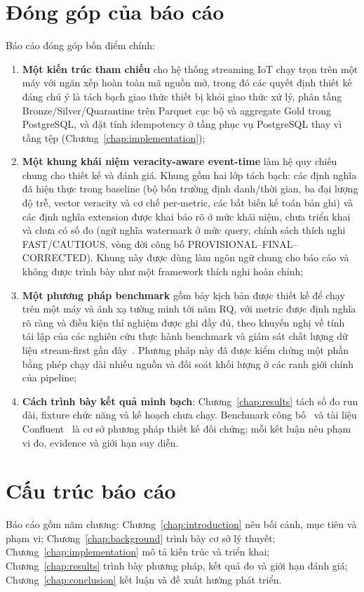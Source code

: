 \section{Đóng góp của báo cáo}

Báo cáo đóng góp bốn điểm chính:

\begin{enumerate}
  \item \textbf{Một kiến trúc tham chiếu} cho hệ thống streaming IoT chạy
        trọn trên một máy với ngăn xếp hoàn toàn mã nguồn mở, trong đó các
        quyết định thiết kế đáng chú ý là tách bạch giao thức thiết bị khỏi
        giao thức xử lý, phân tầng Bronze/Silver/Quarantine trên Parquet
        cục bộ và aggregate Gold trong PostgreSQL,
        và đặt tính idempotency ở tầng phục vụ PostgreSQL thay vì tầng tệp
        (Chương~\ref{chap:implementation});
  \item \textbf{Một khung khái niệm veracity-aware event-time} làm hệ quy
        chiếu chung cho thiết kế và đánh giá. Khung gồm hai lớp tách bạch:
        các định nghĩa đã hiện thực trong baseline (bộ bốn trường
        định danh/thời gian, ba đại lượng độ trễ, vector veracity và cơ chế
        per-metric, các bất biến kế toán bản ghi) và các định nghĩa
        extension được khai báo rõ ở mức khái niệm, chưa triển khai và chưa
        có số đo (ngữ nghĩa watermark ở mức query, chính sách thích nghi
        FAST/CAUTIOUS, vòng đời công bố PROVISIONAL--FINAL--CORRECTED).
        Khung này được dùng làm ngôn ngữ chung cho báo cáo và không được
        trình bày như một framework thích nghi hoàn chỉnh;
  \item \textbf{Một phương pháp benchmark} gồm bảy kịch bản được thiết kế
        để chạy trên một máy và ánh xạ tường minh tới năm RQ, với metric
        được định nghĩa rõ ràng và điều kiện thí nghiệm được ghi đầy đủ,
        theo khuyến nghị về tính tái lập của các nghiên cứu thực hành
        benchmark và giám sát chất lượng dữ liệu stream-first gần
        đây~\cite{kafka_patterns_benchmark_2025, stream_daq_2024}. Phương
        pháp này đã được kiểm chứng một phần bằng phép chạy dài nhiều nguồn
        và đối soát khối lượng ở các ranh giới chính của pipeline;
  \item \textbf{Cách trình bày kết quả minh bạch}: Chương~\ref{chap:results}
        tách số đo run dài, fixture chức năng và kế hoạch chưa chạy.
        Benchmark công bố~\cite{shufflebench_2024, fault_recovery_stream_2024}
        và tài liệu Confluent~\cite{confluent_partition_count,
        confluent_optimize_clients} là cơ sở phương pháp thiết kế đối
        chứng; mỗi kết luận nêu phạm vi đo, evidence và giới hạn suy diễn.
\end{enumerate}

\section{Cấu trúc báo cáo}

Báo cáo gồm năm chương: Chương~\ref{chap:introduction} nêu bối cảnh,
mục tiêu và phạm vi; Chương~\ref{chap:background} trình bày cơ sở lý
thuyết; Chương~\ref{chap:implementation} mô tả kiến trúc và triển khai;
Chương~\ref{chap:results} trình bày phương pháp, kết quả đo và giới hạn
đánh giá; Chương~\ref{chap:conclusion} kết luận và đề xuất hướng phát triển.
